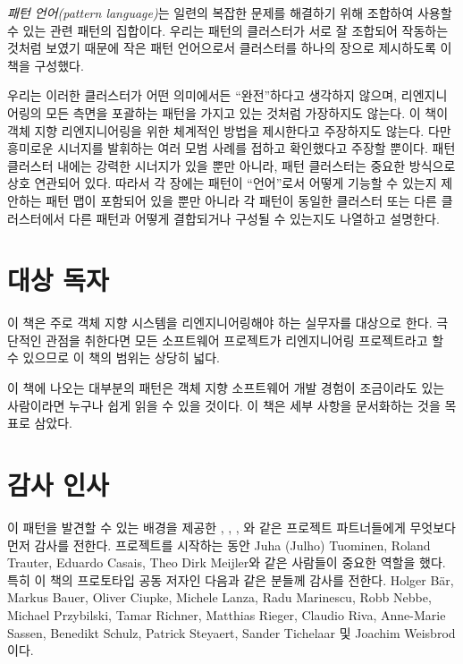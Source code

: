 \documentclass[a4paper,10pt,twoside]{book}
\begin{document}
\emph{패턴 언어(pattern language)}는 일련의 복잡한 문제를 해결하기 위해 조합하여 사용할 수 있는 관련 패턴의 집합이다. 우리는 패턴의 클러스터가 서로 잘 조합되어 작동하는 것처럼 보였기 때문에 작은 패턴 언어으로서 클러스터를 하나의 장으로 제시하도록 이 책을 구성했다.

우리는 이러한 클러스터가 어떤 의미에서든 ``완전''하다고 생각하지 않으며, 리엔지니어링의 모든 측면을 포괄하는 패턴을 가지고 있는 것처럼 가장하지도 않는다. 이 책이 객체 지향 리엔지니어링을 위한 체계적인 방법을 제시한다고 주장하지도 않는다. 다만 흥미로운 시너지를 발휘하는 여러 모범 사례를 접하고 확인했다고 주장할 뿐이다. 패턴 클러스터 내에는 강력한 시너지가 있을 뿐만 아니라, 패턴 클러스터는 중요한 방식으로 상호 연관되어 있다. 따라서 각 장에는 패턴이 ``언어''로서 어떻게 기능할 수 있는지 제안하는 패턴 맵이 포함되어 있을 뿐만 아니라 각 패턴이 동일한 클러스터 또는 다른 클러스터에서 다른 패턴과 어떻게 결합되거나 구성될 수 있는지도 나열하고 설명한다. 

\section*{대상 독자}

이 책은 주로 객체 지향 시스템을 리엔지니어링해야 하는 실무자를 대상으로 한다. 극단적인 관점을 취한다면 모든 소프트웨어 프로젝트가 리엔지니어링 프로젝트라고 할 수 있으므로 이 책의 범위는 상당히 넓다.

이 책에 나오는 대부분의 패턴은 객체 지향 소프트웨어 개발 경험이 조금이라도 있는 사람이라면 누구나 쉽게 읽을 수 있을 것이다. 이 책은 세부 사항을 문서화하는 것을 목표로 삼았다.

\section*{감사 인사}

이 패턴을 발견할 수 있는 배경을 제공한 , , , 와 같은  프로젝트 파트너들에게 무엇보다 먼저 감사를 전한다. 프로젝트를 시작하는 동안 Juha (Julho) Tuominen, Roland Trauter, Eduardo Casais, Theo Dirk Meijler와 같은 사람들이 중요한 역할을 했다. 특히 이 책의 프로토타입 공동 저자인 다음과 같은 분들께 감사를 전한다. Holger B\"ar, Markus Bauer, Oliver Ciupke, Michele Lanza, Radu Marinescu, Robb Nebbe, Michael Przybilski, Tamar Richner, Matthias Rieger, Claudio Riva, Anne-Marie Sassen, Benedikt Schulz, Patrick Steyaert, Sander Tichelaar 및 Joachim Weisbrod이다.
\end{document}
